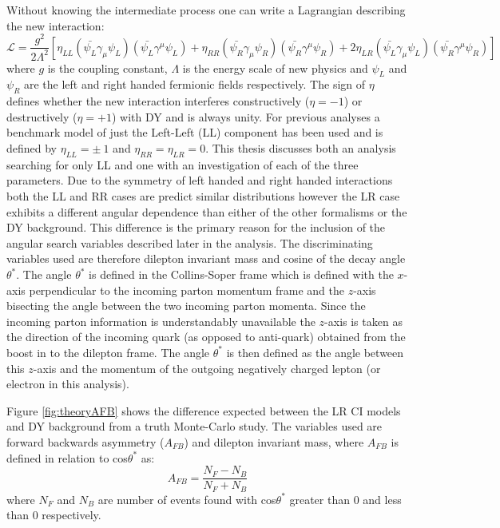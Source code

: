         Without knowing the intermediate process one can write a Lagrangian describing the new interaction:
        \begin{equation}
            \mathcal{L} = \frac{g^{2}}{2\Lambda^{2}}
                [\eta_{LL} (\bar{\psi_{L}}\gamma_{\mu}\psi_{L}) (\bar{\psi_{L}}\gamma^{\mu}\psi_{L}) 
                + \eta_{RR} (\bar{\psi_{R}}\gamma_{\mu}\psi_{R}) (\bar{\psi_{R}}\gamma^{\mu}\psi_{R}) 
                + 2\eta_{LR} (\bar{\psi_{L}}\gamma_{\mu}\psi_{L}) (\bar{\psi_{R}}\gamma^{\mu}\psi_{R}) ]
        \end{equation}
        where $g$ is the coupling constant, $\Lambda$ is the energy scale of new physics and $\psi_{L}$ and $\psi_{R}$ are the left and right handed fermionic fields respectively. The sign of $\eta$ defines whether the new interaction interferes constructively ($\eta = -1$) or destructively ($\eta = +1$) with DY and is always unity. For previous analyses \cite{PhysRevLett.103.191803,PhysRevLett.96.211801,PhysRevD.87.015010} a benchmark model of just the Left-Left (LL) component has been used and is defined by $\eta_{LL} = \pm~1$ and $\eta_{RR} = \eta_{LR} = 0$. This thesis discusses both an analysis searching for only LL and one with an investigation of each of the three parameters. Due to the symmetry of left handed and right handed interactions both the LL and RR cases are predict similar distributions however the LR case exhibits a different angular dependence than either of the other formalisms or the DY background. This difference is the primary reason for the inclusion of the angular search variables described later in the analysis. The discriminating variables used are therefore dilepton invariant mass and cosine of the decay angle $\theta^{*}$. The angle $\theta^{*}$ is defined in the Collins-Soper frame \cite{PhysRevD.16.2219} which is defined with the $x$-axis perpendicular to the incoming parton momentum frame and the $z$-axis bisecting the angle between the two incoming parton momenta. Since the incoming parton information is understandably unavailable the $z$-axis is taken as the direction of the incoming quark (as opposed to anti-quark) obtained from the boost in to the dilepton frame. The angle $\theta^{*}$ is then defined as the angle between this $z$-axis and the momentum of the outgoing negatively charged lepton (or electron in this analysis).


        Figure \ref{fig:theoryAFB} shows the difference expected between the LR CI models and DY background from a truth Monte-Carlo study. The variables used are forward backwards asymmetry ($A_{FB}$) and dilepton invariant mass, where $A_{FB}$ is defined in relation to cos$\theta^{*}$ as:
        \begin{equation}
            A_{FB} = 
                \frac{N_{F} - N_{B}}{N_{F} + N_{B}}
            \label{eq:AFB}
        \end{equation}
        where $N_{F}$ and $N_{B}$ are number of events found with cos$\theta^{*}$ greater than 0 and less than 0 respectively.
        
